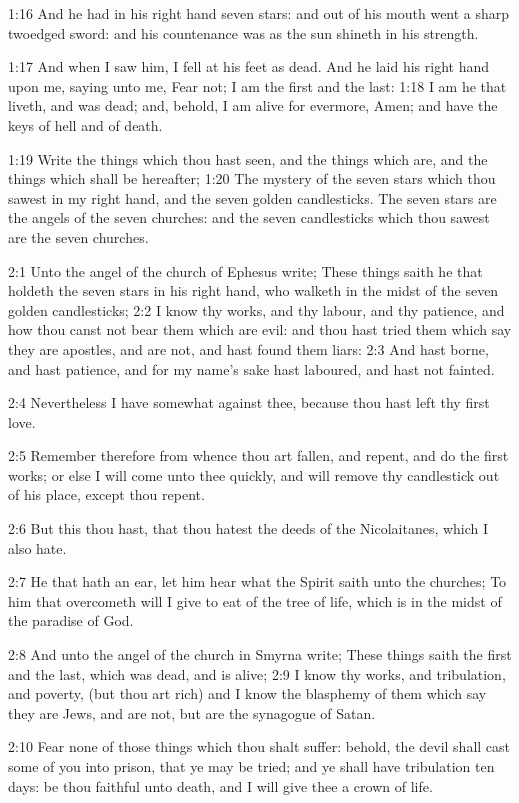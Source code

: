 1:16 And he had in his right hand seven stars: and out of his mouth went a sharp twoedged sword: and his countenance was as the sun shineth in his strength.

1:17 And when I saw him, I fell at his feet as dead. And he laid his right hand upon me, saying unto me, Fear not; I am the first and the last: 1:18 I am he that liveth, and was dead; and, behold, I am alive for evermore, Amen; and have the keys of hell and of death.

1:19 Write the things which thou hast seen, and the things which are, and the things which shall be hereafter; 1:20 The mystery of the seven stars which thou sawest in my right hand, and the seven golden candlesticks. The seven stars are the angels of the seven churches: and the seven candlesticks which thou sawest are the seven churches.

2:1 Unto the angel of the church of Ephesus write; These things saith he that holdeth the seven stars in his right hand, who walketh in the midst of the seven golden candlesticks; 2:2 I know thy works, and thy labour, and thy patience, and how thou canst not bear them which are evil: and thou hast tried them which say they are apostles, and are not, and hast found them liars: 2:3 And hast borne, and hast patience, and for my name's sake hast laboured, and hast not fainted.

2:4 Nevertheless I have somewhat against thee, because thou hast left thy first love.

2:5 Remember therefore from whence thou art fallen, and repent, and do the first works; or else I will come unto thee quickly, and will remove thy candlestick out of his place, except thou repent.

2:6 But this thou hast, that thou hatest the deeds of the Nicolaitanes, which I also hate.

2:7 He that hath an ear, let him hear what the Spirit saith unto the churches; To him that overcometh will I give to eat of the tree of life, which is in the midst of the paradise of God.

2:8 And unto the angel of the church in Smyrna write; These things saith the first and the last, which was dead, and is alive; 2:9 I know thy works, and tribulation, and poverty, (but thou art rich) and I know the blasphemy of them which say they are Jews, and are not, but are the synagogue of Satan.

2:10 Fear none of those things which thou shalt suffer: behold, the devil shall cast some of you into prison, that ye may be tried; and ye shall have tribulation ten days: be thou faithful unto death, and I will give thee a crown of life.

